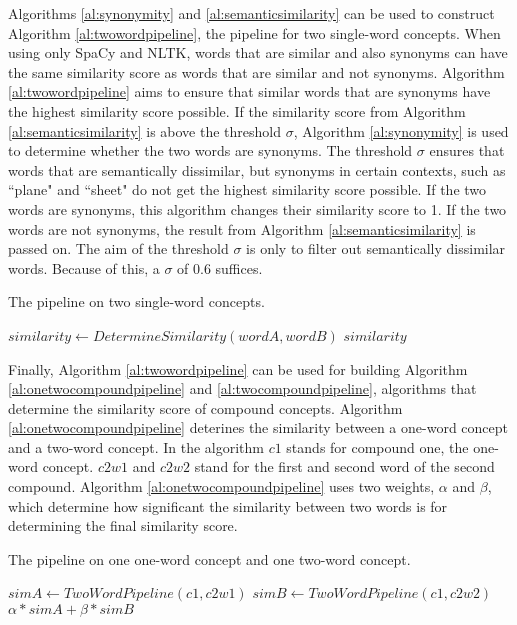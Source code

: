\documentclass{article}
\begin{document}
Algorithms \ref{al:synonymity} and \ref{al:semanticsimilarity} can be used to construct Algorithm \ref{al:twowordpipeline}, the pipeline for two single-word concepts.  When using only SpaCy and NLTK, words that are similar and also synonyms can have the same similarity score as words that are similar and not synonyms. Algorithm \ref{al:twowordpipeline} aims to ensure that similar words that are synonyms have the highest similarity score possible. If the similarity score from Algorithm \ref{al:semanticsimilarity} is above the threshold $\sigma$, Algorithm \ref{al:synonymity} is used to determine whether the two words are synonyms. The threshold $\sigma$ ensures that words that are semantically dissimilar, but synonyms in certain contexts, such as ``plane" and ``sheet" do not get the highest similarity score possible. If the two words are synonyms, this algorithm changes their similarity score to 1. If the two words are not synonyms, the result from Algorithm \ref{al:semanticsimilarity} is passed on. The aim of the threshold $\sigma$ is only to filter out semantically dissimilar words. Because of this, a $\sigma$ of 0.6 suffices.

\begin{algorithm}
\caption{The pipeline on two single-word concepts.}\label{al:twowordpipeline}
\begin{algorithmic}[1]
		\State $\textit{similarity} \gets \textit{DetermineSimilarity}(wordA, wordB)$
				\State {}
			\EndIf
		\EndIf
		\State \Return $\textit{similarity}$
	\EndProcedure
\end{algorithmic}
\end{algorithm}

Finally, Algorithm \ref{al:twowordpipeline} can be used for building Algorithm \ref{al:onetwocompoundpipeline} and \ref{al:twocompoundpipeline}, algorithms that determine the similarity score of compound concepts. Algorithm \ref{al:onetwocompoundpipeline} deterines the similarity between a one-word concept and a two-word concept. In the algorithm $c1$ stands for compound one, the one-word concept. $c2w1$ and $c2w2$ stand for the first and second word of the second compound. Algorithm \ref{al:onetwocompoundpipeline} uses two weights, $\alpha$ and $\beta$, which determine how significant the similarity between two words is for determining the final similarity score.

\begin{algorithm}
\caption{The pipeline on one one-word concept and one two-word concept.}\label{al:onetwocompoundpipeline}
\begin{algorithmic}[1]
		\State $\textit{simA} \gets \textit{TwoWordPipeline}(c1, c2w1)$
		\State $\textit{simB} \gets \textit{TwoWordPipeline}(c1, c2w2)$
		\State \Return $\alpha * \textit{simA} + \beta * \textit{simB}$
	\EndProcedure
\end{algorithmic}
\end{algorithm}
\end{document}
